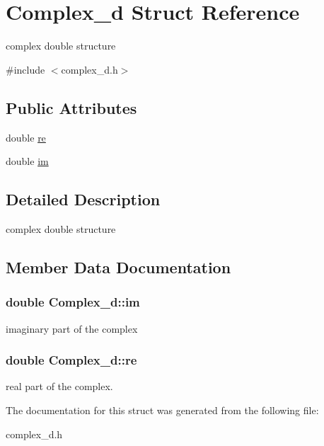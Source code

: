 \hypertarget{structComplex__d}{}\section{Complex\+\_\+d Struct Reference}
\label{structComplex__d}


complex double structure  




{\ttfamily \#include $<$complex\+\_\+d.\+h$>$}

\subsection*{Public Attributes}
\begin{DoxyCompactItemize}
\item 
double \hyperlink{structComplex__d_af793c4b6a0beb61cbc45630aebb9666f}{re}
\item 
double \hyperlink{structComplex__d_ade0f1dbd3f26e1b9ed7aba5df54c707e}{im}
\end{DoxyCompactItemize}


\subsection{Detailed Description}
complex double structure 

\subsection{Member Data Documentation}
\subsubsection[{\texorpdfstring{im}{im}}]{\setlength{\rightskip}{0pt plus 5cm}double Complex\+\_\+d\+::im}\hypertarget{structComplex__d_ade0f1dbd3f26e1b9ed7aba5df54c707e}{}\label{structComplex__d_ade0f1dbd3f26e1b9ed7aba5df54c707e}
imaginary part of the complex 
\subsubsection[{\texorpdfstring{re}{re}}]{\setlength{\rightskip}{0pt plus 5cm}double Complex\+\_\+d\+::re}\hypertarget{structComplex__d_af793c4b6a0beb61cbc45630aebb9666f}{}\label{structComplex__d_af793c4b6a0beb61cbc45630aebb9666f}
real part of the complex. 

The documentation for this struct was generated from the following file\+:\begin{DoxyCompactItemize}
\item 
complex\+\_\+d.\+h\end{DoxyCompactItemize}
